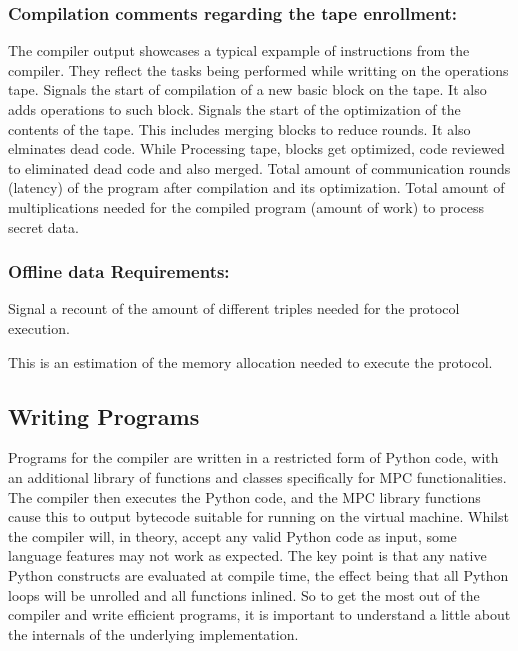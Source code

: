\subsubsection{Compilation comments regarding the tape enrollment:} 
The compiler output showcases a typical expample of instructions from the compiler. They reflect the tasks being performed while writting on the operations tape.
Signals the start of compilation of a new basic block on the tape. It also adds operations to such block.
Signals the start of the optimization of the contents of the tape. This includes merging blocks to reduce rounds. It also elminates dead code.
While Processing tape, blocks get optimized, code reviewed to eliminated dead code and also merged.
Total amount of communication rounds (latency) of the program after compilation and its optimization.
Total amount of multiplications needed for the compiled program (amount of work) to process secret data.

\subsubsection{Offline data Requirements:} 

Signal a recount of the amount of different triples needed for the protocol execution. 

This is an estimation of the memory allocation needed to execute the protocol.

\subsection{Writing Programs}

Programs for the compiler are written in a restricted form of Python code,
with an additional library of functions and classes specifically for MPC
functionalities. The compiler then executes the Python code, and the MPC
library functions cause this to output
bytecode suitable for running on the virtual machine.
Whilst the compiler will, in theory, accept any valid Python
code as input, some language features may not work as expected.
The key point is that any native Python constructs are evaluated at compile
time, the effect being that all Python loops will be unrolled and all functions
inlined.
So to get the most out of the compiler and write efficient programs,
it is important to understand a little about the internals of the underlying implementation.

